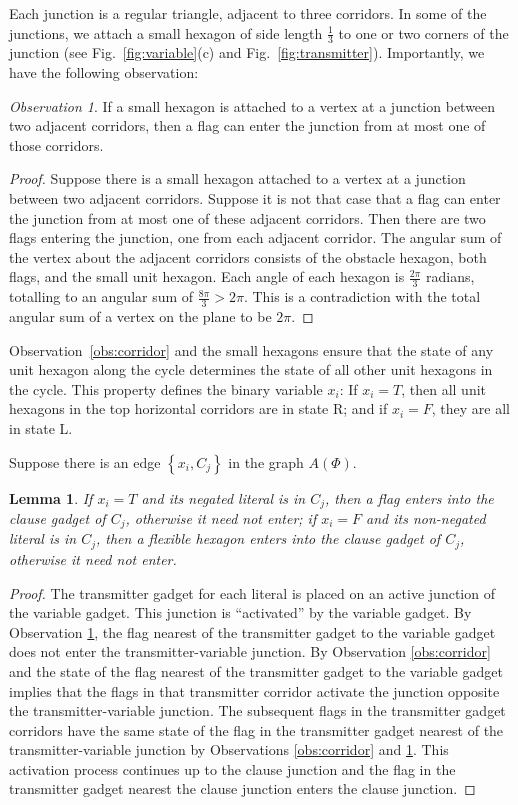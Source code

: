 \documentclass[10pt]{CSUNthesis}
\theoremstyle{plain}%
\newtheorem{lem}{Lemma}
\theoremstyle{definition}
\theoremstyle{remark}
\newtheorem{observation}{Observation}
\begin{document}
Each junction is a regular triangle, adjacent to three corridors. 
In some of the junctions, we attach a small hexagon of side length $\frac{1}{3}$ to one or two corners of the junction (see Fig.~\ref{fig:variable}(c) and Fig.~\ref{fig:transmitter}). 
Importantly, we have the following observation:
\begin{observation}\label{obs:junction}
If a small hexagon is attached to a vertex at a junction between two adjacent corridors, then a flag can enter the junction from at most one of those corridors.
\end{observation}
\begin{proof}
Suppose there is a small hexagon attached to a vertex at a junction between two adjacent corridors.
Suppose it is not that case that a flag can enter the junction from at most one of these adjacent corridors.
Then there are two flags entering the junction, one from each adjacent corridor.
The angular sum of the vertex about the adjacent corridors consists of the obstacle hexagon, both flags, and the small unit hexagon.
Each angle of each hexagon is $\frac{2 \pi}{3}$ radians, totalling to an angular sum of $\frac{8 \pi}{3} > 2 \pi$.
This is a contradiction with the total angular sum of a vertex on the plane to be $2 \pi$.
\end{proof}

Observation~\ref{obs:corridor} and the small hexagons ensure that the state of any unit hexagon along the cycle determines the state of all other unit hexagons in the cycle. 
This property defines the binary variable $x_i$: If $x_i=T$, then all unit hexagons in the top horizontal corridors are in state R; and if $x_i=F$, they are all in state L.

Suppose there is an edge $\left\lbrace x_i, C_j \right\rbrace$ in the graph $A(\Phi)$.
\begin{lem}\label{lem:aux-3}
If $x_i = T$ and its negated literal is in $C_j$, then a flag enters into the clause gadget of $C_j$, otherwise it need not enter; if $x_i = F$ and its non-negated literal is in $C_j$, then a flexible hexagon enters into the clause gadget of $C_j$, otherwise it need not enter.
\end{lem}
\begin{proof}
The transmitter gadget for each literal is placed on an active junction of the variable gadget. 
This junction is ``activated'' by the variable gadget.  
By Observation \ref{obs:junction}, the flag nearest of the transmitter gadget to the variable gadget does not enter the transmitter-variable junction.
By Observation \ref{obs:corridor} and the state of the flag nearest of the transmitter gadget to the variable gadget implies that the flags in that transmitter corridor activate the junction opposite the transmitter-variable junction.
The subsequent flags in the transmitter gadget corridors have the same state of the flag in the transmitter gadget nearest of the transmitter-variable junction by Observations \ref{obs:corridor} and \ref{obs:junction}.
This activation process continues up to the clause junction and the flag in the transmitter gadget nearest the clause junction enters the clause junction.
\end{proof}
\end{document}
